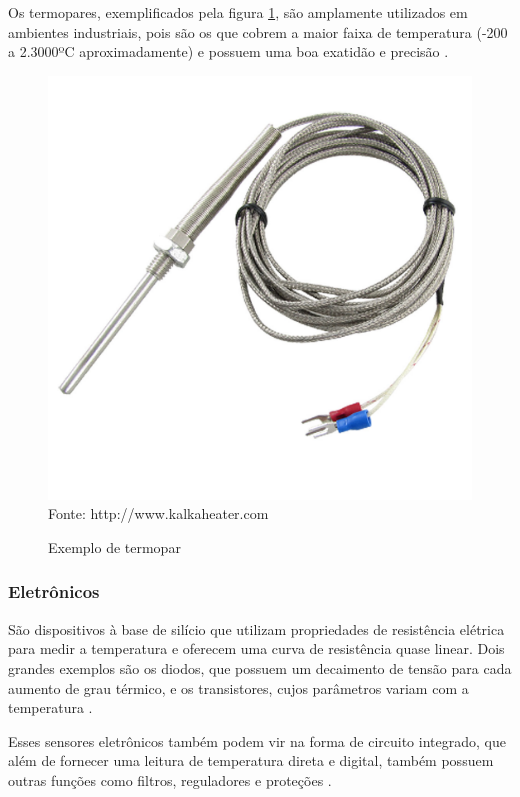 Os termopares, exemplificados pela figura \ref{figura:thermocouple}, são amplamente utilizados em ambientes
industriais, pois são os que cobrem a maior faixa de temperatura (-200 a 2.3000ºC aproximadamente) e possuem
uma boa exatidão e precisão \cite{thomazini_albuquerque2005}.

\begin{figure}[h]
	\caption{Exemplo de termopar}
	\centering
	\includegraphics[scale=0.15]{../images/termopar.jpg}
	\hspace{\linewidth}
	Fonte: http://www.kalkaheater.com
	\label{figura:thermocouple}
\end{figure}

\subsubsection{Eletrônicos}
São dispositivos à base de silício que utilizam propriedades de resistência elétrica para medir a temperatura
e oferecem uma curva de resistência quase linear. Dois grandes exemplos são os diodos, que possuem um
decaimento de tensão para cada aumento de grau térmico, e os transistores, cujos parâmetros variam com a
temperatura \cite{thomazini_albuquerque2005}.

Esses sensores eletrônicos também podem vir na forma de circuito integrado, que além de fornecer uma leitura
de temperatura direta e digital, também possuem outras funções como filtros, reguladores e proteções
\cite{fontes2005,thomazini_albuquerque2005}.

